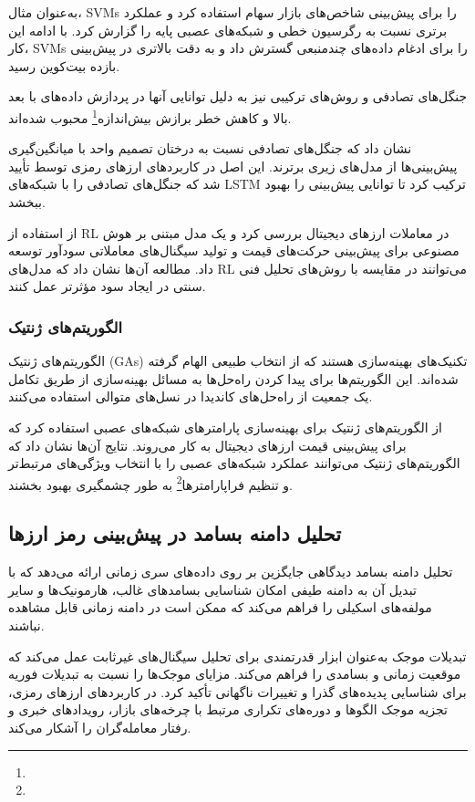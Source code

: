 به‌عنوان مثال، \cite{guresen2011using} SVMs را برای پیش‌بینی شاخص‌های بازار سهام استفاده کرد و عملکرد برتری نسبت به رگرسیون خطی و شبکه‌های عصبی پایه را گزارش کرد. با ادامه این کار، \cite{chen2020cryptocurrency} SVMs را برای ادغام داده‌های چندمنبعی گسترش داد و به دقت بالاتری در پیش‌بینی بازده بیت‌کوین رسید.


جنگل‌های تصادفی و روش‌های ترکیبی نیز به دلیل توانایی آنها در پردازش داده‌های با بعد بالا و کاهش خطر برازش بیش‌اندازه\footnote{} محبوب شده‌اند. 

\cite{breiman2001random} نشان داد که جنگل‌های تصادفی نسبت به درختان تصمیم واحد با میانگین‌گیری پیش‌بینی‌ها از مدل‌های زیری برترند. این اصل در کاربردهای ارزهای رمزی توسط \cite{wang2021ensemble} تأیید شد که جنگل‌های تصادفی را با شبکه‌های LSTM ترکیب کرد تا توانایی پیش‌بینی را بهبود ببخشد.


\cite{author6} از استفاده از RL در معاملات ارزهای دیجیتال بررسی کرد و یک مدل مبتنی بر هوش مصنوعی برای پیش‌بینی حرکت‌های قیمت و تولید سیگنال‌های معاملاتی سودآور توسعه داد. مطالعه آن‌ها نشان داد که مدل‌های RL می‌توانند در مقایسه با روش‌های تحلیل فنی سنتی در ایجاد سود مؤثرتر عمل کنند.

\subsubsection{الگوریتم‌های ژنتیک}
الگوریتم‌های ژنتیک (GAs) تکنیک‌های بهینه‌سازی هستند که از انتخاب طبیعی الهام گرفته شده‌اند. این الگوریتم‌ها برای پیدا کردن راه‌حل‌ها به مسائل بهینه‌سازی از طریق تکامل یک جمعیت از راه‌حل‌های کاندیدا در نسل‌های متوالی استفاده می‌کنند.

\cite{author7} از الگوریتم‌های ژنتیک برای بهینه‌سازی پارامترهای شبکه‌های عصبی استفاده کرد که برای پیش‌بینی قیمت ارزهای دیجیتال به کار می‌روند. نتایج آن‌ها نشان داد که الگوریتم‌های ژنتیک می‌توانند عملکرد شبکه‌های عصبی را با انتخاب ویژگی‌های مرتبط‌تر و تنظیم فراپارامتر‌ها\footnote{} به طور چشمگیری بهبود بخشند.


\subsection{تحلیل دامنه بسامد در پیش‌بینی رمز ارز‌ها}
تحلیل دامنه بسامد دیدگاهی جایگزین بر روی داده‌های سری زمانی ارائه می‌دهد که با تبدیل آن به دامنه طیفی امکان شناسایی بسامدهای غالب، هارمونیک‌ها و سایر مولفه‌های اسکیلی را فراهم می‌کند که ممکن است در دامنه زمانی قابل مشاهده نباشند.


تبدیلات موجک به‌عنوان ابزار قدرتمندی برای تحلیل سیگنال‌های غیرثابت عمل می‌کند که موقعیت زمانی و بسامدی را فراهم می‌کند. \cite{percival2000wavelet} مزایای موجک‌ها را نسبت به تبدیلات فوریه برای شناسایی پدیده‌های گذرا و تغییرات ناگهانی تأکید کرد. در کاربردهای ارزهای رمزی، تجزیه موجک الگوها و دوره‌های تکراری مرتبط با چرخه‌های بازار، رویدادهای خبری و رفتار معامله‌گران را آشکار می‌کند.


